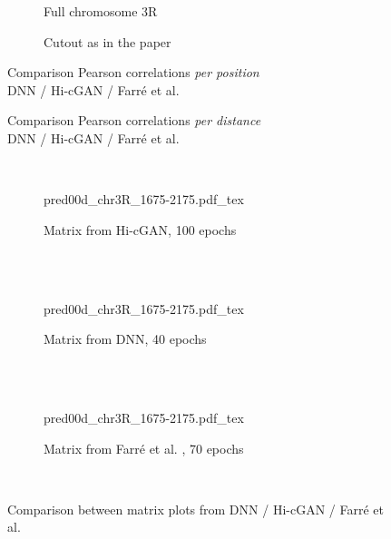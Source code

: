 \begin{figure}[htbp]
 \begin{subfigure}{0.45\textwidth}
  \caption{Full chromosome 3R}
 \end{subfigure}\hfill
 \begin{subfigure}{0.45\textwidth}
  \caption{Cutout as in the paper \cite{Farre2018a}}
 \end{subfigure}
\caption{Comparison Pearson correlations \emph{per position}\\DNN / Hi-cGAN / Farr\'e et al. \cite{Farre2018a}}\label{fig:results:farre-vs-ours_pearson-pos_3R}
\end{figure}
\begin{figure}[htbp]
 \centering
 \caption{Comparison Pearson correlations \emph{per distance}\\DNN / Hi-cGAN / Farr\'e et al.}\label{fig:results:farre-vs-ours_pearson-dist_3R}
\end{figure}

\begin{figure}[htbp]
\\
\begin{subfigure}{\textwidth}
 \centering
 \scriptsize
 {pred00d_chr3R_1675-2175.pdf_tex}
 \caption{Matrix from Hi-cGAN, 100 epochs} \label{fig:results:farre-vs-ours_cgan-matrix}
\end{subfigure}\\[5mm]
\\
\begin{subfigure}{\textwidth}
 \centering
 \scriptsize
 {pred00d_chr3R_1675-2175.pdf_tex}
 \caption{Matrix from DNN, 40 epochs} \label{fig:results:farre-vs-ours_dnn-matrix}
\end{subfigure}\\[5mm]
\\
\begin{subfigure}{\textwidth}
 \centering
 \scriptsize
 {pred00d_chr3R_1675-2175.pdf_tex}
 \caption{Matrix from Farr\'e et al. \cite{Farre2018a}, 70 epochs} \label{fig:results:farre-vs-ours_farre-matrix}
\end{subfigure}\\[5mm]
\caption{Comparison between matrix plots from DNN / Hi-cGAN / Farr\'e et al. \cite{Farre2018a}} \label{fig:results:farre-vs-ours_matrices}
\end{figure}

\clearpage
